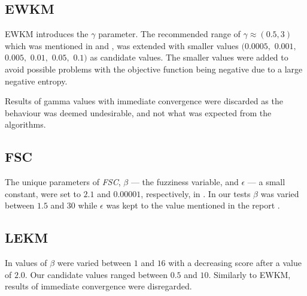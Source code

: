 \documentclass[../report.tex]{subfiles}
\begin{document}

\subsection{EWKM}
EWKM introduces the $\gamma$ parameter. The recommended range of $\gamma \approx (0.5, 3)$ which was mentioned in \citeauthor{Jing2007} \cite{Jing2007} and \citeauthor{wskm2014hz} \cite{wskm2014hz}, was extended with smaller values $(0.0005,$ $0.001,$ $0.005,$ $0.01,$ $0.05,$ $0.1)$ as candidate values. The smaller values were added to avoid possible problems with the objective function being negative due to a large negative entropy.

Results of gamma values with immediate convergence were discarded as the behaviour was deemed undesirable, and not what was expected from the algorithms.

\subsection{FSC}
The unique parameters of \textit{FSC}, $\beta$ --- the fuzziness variable, and $\epsilon$ --- a small constant, were set to $2.1$ and $0.00001$, respectively, in \cite{Gan2006}. In our tests $\beta$ was varied between $1.5$ and $30$ while $\epsilon$ was kept to the value mentioned in the report \citeauthor{Gan2006} \cite{Gan2006}.

\subsection{LEKM}
In \citeauthor{Gan2016} \cite{Gan2016} values of $\beta$ were varied between $1$ and $16$ with a decreasing score after a value of $2.0$. Our candidate values ranged between $0.5$ and $10$. Similarly to EWKM, results of immediate convergence were disregarded.


\end{document}
